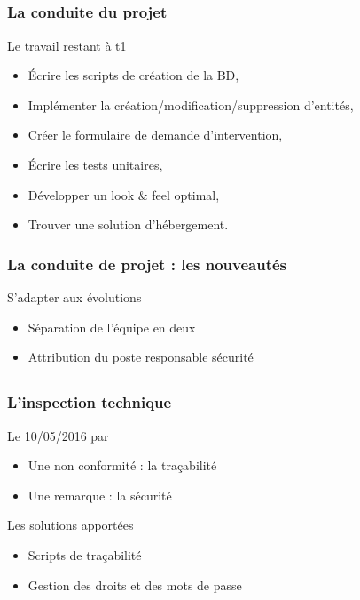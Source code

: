 \speaker{\Pierre{}}
\subsection{} %

\begin{frame}
\frametitle{La conduite du projet}
\begin{block}{Le travail restant à t1}
\begin{itemize}
	\item Écrire les scripts de création de la BD,
	\item Implémenter la création/modification/suppression d'entités,
	\item Créer le formulaire de demande d'intervention,
	\item Écrire les tests unitaires,
	\item Développer un look & feel optimal,
	\item Trouver une solution d’hébergement.
	
\end{itemize}
\end{block}
\end{frame}

\begin{frame}
\frametitle{La conduite de projet : les nouveautés}
\begin{block}{S'adapter aux évolutions}
\begin{itemize}
	\item Séparation de l'équipe en deux
	\item Attribution du poste responsable sécurité
\end{itemize}
\end{block}

\end{frame}

\subsection{}
\begin{frame}
\frametitle{L'inspection technique}
\begin{block}{Le 10/05/2016 par \nomTuteurPedago{}}
\begin{itemize}
	\item Une non conformité : la traçabilité
	\item Une remarque : la sécurité
\end{itemize}
\end{block}
\begin{block}{Les solutions apportées}
\begin{itemize}
	\item Scripts de traçabilité
	\item Gestion des droits et des mots de passe
\end{itemize}
\end{block}
\end{frame}

